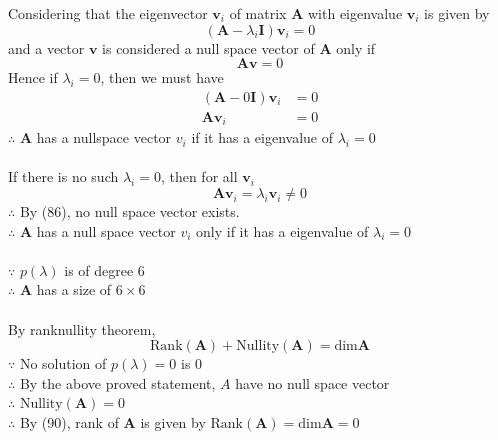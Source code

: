 \documentclass[12pt]{article}
\newcommand{\matr}[1]{\bm{#1}}
\newenvironment{answer}[2][Answer]{\begin{trivlist}
    \item[\hskip \labelsep {\bfseries #1}\hskip \labelsep {\bfseries #2.}]}{\end{trivlist}}
\begin{document}
\begin{answer}{Q. 3}\end{answer}
Considering that the eigenvector $\matr v_i$ of matrix $\matr A$ with eigenvalue $\matr v_i$ is given by
\begin{equation}
	\left(\matr A - \lambda_i \matr I \right)\matr v_i = 0 
\end{equation}
and a vector $\matr v$ is considered a null space vector of $\matr A$ only if
\begin{equation}
	\matr A \matr v = 0
\end{equation}
Hence if $\lambda_i = 0$, then we must have
\begin{align}
	(\matr A - 0 \matr I) \matr v _i & = 0 \\
	\matr A \matr v _ i              & = 0 
\end{align}
$\therefore$ $\matr A$ has a nullspace vector $v_i$ if it has a eigenvalue of $\lambda _i=0$\\ \\

If there is no such $\lambda_i=0$, then for all $\matr v_i$
\begin{equation}
	\matr A \matr v_i = \lambda_i \matr v _i \neq 0
\end{equation}
$\therefore$ By (86), no null space vector exists. \\
$\therefore$ $\matr A$ has a null space vector $v_i$ only if it has a eigenvalue of $\lambda _i=0$ \\\\
$\because$ $p(\lambda)$ is of degree 6 \\
$\therefore$ $\matr A$ has a size of $6\times 6$ \\ \\
By rank\textendash nullity theorem,
\begin{equation}
    \textrm{Rank}(\matr A) + \textrm{Nullity}(\matr A) = \textrm{dim} \matr A
\end{equation}
$\because$ No solution of $p(\lambda)=0$ is 0 \\
$\therefore$ By the above proved statement, $A$ have no null space vector \\
$\therefore$ $\textrm{Nullity}(\matr A)=0$ \\
$\therefore$ By (90), rank of $\matr A$ is given by $\textrm{Rank}(\matr A) = \textrm{dim} \matr A = 0$ \\ \\
\end{document}
